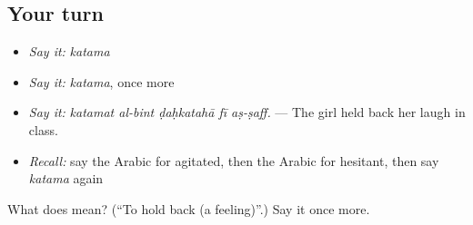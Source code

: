 \subsection*{Your turn}
\begin{itemize}
\raggedright
  \item \emph{Say it:} \emph{katama}
  \item \emph{Say it:} \emph{katama}, once more
  \item \emph{Say it:} \emph{katamat al-bint ḍaḥkatahā fī aṣ-ṣaff.} — The girl held back her laugh in class.
  \item \emph{Recall:} say the Arabic for agitated, then the Arabic for hesitant, then say \emph{katama} again
\end{itemize}

\begin{tcolorbox}[breakable,colback=teal!4,colframe=teal!35!black,title={Before you move on}]
What does  mean? (\textquotedblleft{}To hold back (a feeling)\textquotedblright{}.) Say it once more.
\end{tcolorbox}
